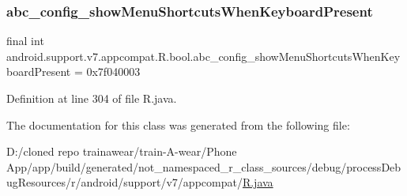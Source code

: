 \subsubsection{\texorpdfstring{abc\_config\_showMenuShortcutsWhenKeyboardPresent}{abc\_config\_showMenuShortcutsWhenKeyboardPresent}}
{\footnotesize\ttfamily final int android.\+support.\+v7.\+appcompat.\+R.\+bool.\+abc\+\_\+config\+\_\+show\+Menu\+Shortcuts\+When\+Keyboard\+Present = 0x7f040003\hspace{0.3cm}{\ttfamily [static]}}



Definition at line 304 of file R.\+java.



The documentation for this class was generated from the following file\+:\begin{DoxyCompactItemize}
\item 
D\+:/cloned repo trainawear/train-\/\+A-\/wear/\+Phone App/app/build/generated/not\+\_\+namespaced\+\_\+r\+\_\+class\+\_\+sources/debug/process\+Debug\+Resources/r/android/support/v7/appcompat/\mbox{\hyperlink{process_debug_resources_2r_2android_2support_2v7_2appcompat_2_r_8java}{R.\+java}}\end{DoxyCompactItemize}
